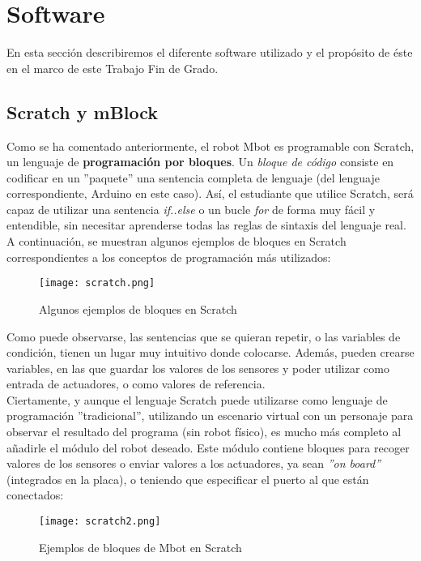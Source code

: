 \section{Software}\label{sec:software}
En esta sección describiremos el diferente software utilizado y el propósito de éste en el marco de este Trabajo Fin de Grado. 

\subsection{Scratch y mBlock}\label{subsec:scratch}
Como se ha comentado anteriormente, el robot Mbot es programable con Scratch, un lenguaje de \textbf{programación por bloques}. Un \textit{bloque de código} consiste en codificar en un ''paquete'' una sentencia completa de lenguaje (del lenguaje correspondiente, Arduino en este caso). Así, el estudiante que utilice Scratch, será capaz de utilizar una sentencia \textit{if..else} o un bucle \textit{for} de forma muy fácil y entendible, sin necesitar aprenderse todas las reglas de sintaxis del lenguaje real. A continuación, se muestran algunos ejemplos de bloques en Scratch correspondientes a los conceptos de programación más utilizados:
\begin{figure}[H]
	\texttt{[image: scratch.png]}
	\centering
	\label{img:scratch}
	\caption{Algunos ejemplos de bloques en Scratch}
\end{figure}
Como puede observarse, las sentencias que se quieran repetir, o las variables de condición, tienen un lugar muy intuitivo donde colocarse. Además, pueden crearse variables, en las que guardar los valores de los sensores y poder utilizar como entrada de actuadores, o como valores de referencia. \\
Ciertamente, y aunque el lenguaje Scratch puede utilizarse como lenguaje de programación ''tradicional'', utilizando un escenario virtual con un personaje para observar el resultado del programa (sin robot físico), es mucho más completo al añadirle el módulo del robot deseado. Este módulo contiene bloques para recoger valores de los sensores o enviar valores a los actuadores, ya sean \textit{''on board''} (integrados en la placa), o teniendo que especificar el puerto al que están conectados:
\begin{figure}[H]
	\texttt{[image: scratch2.png]}
	\centering
	\label{img:scratch2}
	\caption{Ejemplos de bloques de Mbot en Scratch}
\end{figure}

